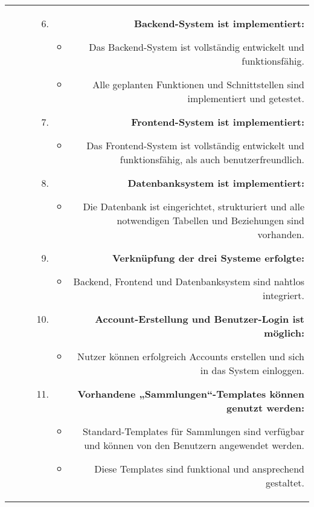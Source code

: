 \begin{tabularx}{\textwidth}{L R}
\begin{enumerate}[left=0pt,label=\arabic*.,itemsep=0.4cm]
        \end{enumerate}
        &
        \begin{enumerate}[left=0pt,label=\arabic*.,itemsep=0.4cm]
            \setcounter{enumi}{5}
            \small

            \item \textbf{Backend-System ist implementiert:}
            \begin{itemize}[label=--]
                \item Das Backend-System ist vollständig entwickelt und funktionsfähig.
                \item Alle geplanten Funktionen und Schnittstellen sind implementiert und getestet.
            \end{itemize}

            \item \textbf{Frontend-System ist implementiert:}
            \begin{itemize}[label=--]
                \item Das Frontend-System ist vollständig entwickelt und funktionsfähig, als auch benutzerfreundlich.
            \end{itemize}

            \item \textbf{Datenbanksystem ist implementiert:}
            \begin{itemize}[label=--]
                \item Die Datenbank ist eingerichtet, strukturiert und alle notwendigen Tabellen und Beziehungen sind vorhanden.
            \end{itemize}

            \item \textbf{Verknüpfung der drei Systeme erfolgte:}
            \begin{itemize}[label=--]
                \item Backend, Frontend und Datenbanksystem sind nahtlos integriert.
            \end{itemize}

            \item \textbf{Account-Erstellung und Benutzer-Login ist möglich:}
            \begin{itemize}[label=--]
                \item Nutzer können erfolgreich Accounts erstellen und sich in das System einloggen.
            \end{itemize}

            \item \textbf{Vorhandene „Sammlungen“-Templates können genutzt werden:}
            \begin{itemize}[label=--]
                \item Standard-Templates für Sammlungen sind verfügbar und können von den Benutzern angewendet werden.
                \item Diese Templates sind funktional und ansprechend gestaltet.
            \end{itemize}


\end{enumerate}
\end{tabularx}
